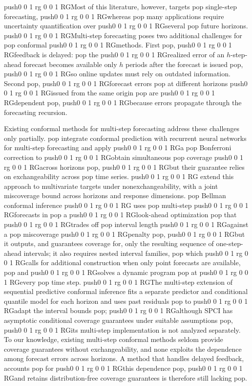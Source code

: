 \documentclass[
  american,
  12pt]{article}
\theoremstyle{plain}
\theoremstyle{plain}
\theoremstyle{remark}
\newcommand{\CPTSadd}[1]{\ifmmode\else\leavevmode\fi\pdfcolorstack 0 push{0 0 1 rg 0 0 1 RG}#1\pdfcolorstack 0 pop}
\begin{document}
\CPTSadd{Most of this literature, however, targets} single-step forecasting,
\CPTSadd{whereas} many applications require uncertainty quantification over
\CPTSadd{several} future horizons. \CPTSadd{Multi-step forecasting poses two additional
challenges for} conformal \CPTSadd{methods. First}, \CPTSadd{feedback is delayed:} the
\CPTSadd{realized error of an \(h\)-step-ahead forecast becomes available only
\(h\) periods after the forecast is issued}, \CPTSadd{so online updates must rely
on outdated information. Second}, \CPTSadd{forecast errors} at different horizons
\CPTSadd{issued from the same origin} are \CPTSadd{dependent}, \CPTSadd{because errors propagate
through the forecasting recursion.

Existing conformal methods for multi-step forecasting address these
challenges only partially.} \citet{stankeviciute2021} integrate conformal
prediction with recurrent neural networks for multi-step forecasting and
apply \CPTSadd{a} Bonferroni correction to \CPTSadd{obtain simultaneous} coverage \CPTSadd{across
horizons}, \CPTSadd{but their guarantee relies on exchangeability across} time
series. \CPTSadd{\citet{schlembach2025} extend this approach to multivariate
targets under nonexchangeability, with a joint miscoverage bound across
horizons and response dimensions.} Bellman conformal inference
\CPTSadd{\citep{yang2024ts} uses} multi-step \CPTSadd{forecasts in} a \CPTSadd{look-ahead
optimization} that \CPTSadd{trades off} interval length \CPTSadd{against a} miscoverage
\CPTSadd{penalty}, \CPTSadd{but it outputs, and guarantees coverage for, only the resulting
sequence of one-step-ahead intervals; it also requires nested interval
families,} which \CPTSadd{calls for additional construction when only point
forecasts are available,} and \CPTSadd{solves a dynamic program} at \CPTSadd{every} time
step. \CPTSadd{The multi-step extension of sequential predictive conformal
inference \citep[SPCI,][]{xu2023} fits a separate predictor and
conditional quantile model for each horizon and uses past residuals} to
\CPTSadd{adapt the interval bounds}; \CPTSadd{although SPCI has asymptotic conditional
coverage guarantees under suitable assumptions}, \CPTSadd{its multi-step
implementation is not analyzed separately. To our knowledge, existing
multi-step conformal methods seldom provide coverage guarantees without
exchangeability, and none exploits the dependence among forecast errors
across horizons. A method that handles delayed feedback, accounts} for
\CPTSadd{this dependence}, \CPTSadd{and retains distribution-free coverage guarantees is
therefore still lacking}.
\end{document}
